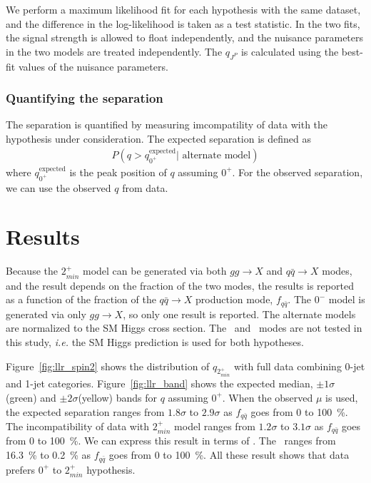 We perform a maximum likelihood fit for each hypothesis with the same dataset,
and the difference in the log-likelihood is taken as a test statistic. 
In the two fits, the signal strength is allowed to float independently, 
and the nuisance parameters in the two models are treated independently. 
The $q_{J^P}$ is calculated using the best-fit values of the nuisance parameters. 

\subsubsection{Quantifying the separation}

The separation is quantified by measuring imcompatility of data with 
the hypothesis under consideration. The expected separation is defined as  
\begin{eqnarray} 
P(q > q_{0^+}^{\textrm{expected}} | \textrm{ alternate model}) 
\end{eqnarray} 
where $q_{0^+}^{\textrm{expected}}$ is the peak position of $q$ assuming $0^+$.
For the observed separation, we can use the observed $q$ from data. 

\section{Results}

Because the $2_{min}^+$ model can be generated via both $gg\rightarrow X$ 
and $q\bar{q }\rightarrow X$ modes, and the result depends on the fraction of the two modes, 
the results is reported as a function of the fraction of the $q\bar{q} \rightarrow X$ production mode, 
$f_{q\bar{q}}$. The $0^-$ model is generated via only $gg\rightarrow X$,
so only one result is reported. The alternate models are normalized to the 
SM Higgs cross section. The \qqH\ and \qqVH\ modes are not tested in this study, 
\textit{i.e.} the SM Higgs prediction is used for both hypotheses. 

Figure~\ref{fig:llr_spin2} shows the distribution of $q_{2_{min}^+}$ with full data 
combining 0-jet and 1-jet categories. 
Figure~\ref{fig:llr_band} shows the expected median, $\pm1\sigma$(green) 
and  $\pm2\sigma$(yellow) bands for $q$ assuming $0^+$. 
When the observed $\mu$ is used, the expected separation ranges from 
$1.8\sigma$ to $2.9\sigma$ as $f_{q\bar{q}}$ goes from 0 to 100~\%.
The incompatibility of data with $2_{min}^+$ model ranges from  
$1.2\sigma$ to $3.1\sigma$ as $f_{q\bar{q}}$ goes from 0 to 100~\%.
We can express this result in terms of \CLs. The \CLs\ ranges from 
16.3~\% to 0.2~\% as $f_{q\bar{q}}$ goes from 0 to 100~\%.
All these result shows that data prefers $0^+$ to $2_{min}^+$ hypothesis.  

